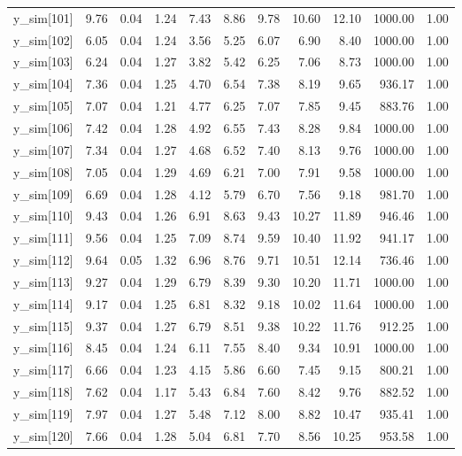 \begin{table}[ht]
\begin{tabular}{rrrrrrrrrrr}
  y\_sim[101] & 9.76 & 0.04 & 1.24 & 7.43 & 8.86 & 9.78 & 10.60 & 12.10 & 1000.00 & 1.00 \\ 
  y\_sim[102] & 6.05 & 0.04 & 1.24 & 3.56 & 5.25 & 6.07 & 6.90 & 8.40 & 1000.00 & 1.00 \\ 
  y\_sim[103] & 6.24 & 0.04 & 1.27 & 3.82 & 5.42 & 6.25 & 7.06 & 8.73 & 1000.00 & 1.00 \\ 
  y\_sim[104] & 7.36 & 0.04 & 1.25 & 4.70 & 6.54 & 7.38 & 8.19 & 9.65 & 936.17 & 1.00 \\ 
  y\_sim[105] & 7.07 & 0.04 & 1.21 & 4.77 & 6.25 & 7.07 & 7.85 & 9.45 & 883.76 & 1.00 \\ 
  y\_sim[106] & 7.42 & 0.04 & 1.28 & 4.92 & 6.55 & 7.43 & 8.28 & 9.84 & 1000.00 & 1.00 \\ 
  y\_sim[107] & 7.34 & 0.04 & 1.27 & 4.68 & 6.52 & 7.40 & 8.13 & 9.76 & 1000.00 & 1.00 \\ 
  y\_sim[108] & 7.05 & 0.04 & 1.29 & 4.69 & 6.21 & 7.00 & 7.91 & 9.58 & 1000.00 & 1.00 \\ 
  y\_sim[109] & 6.69 & 0.04 & 1.28 & 4.12 & 5.79 & 6.70 & 7.56 & 9.18 & 981.70 & 1.00 \\ 
  y\_sim[110] & 9.43 & 0.04 & 1.26 & 6.91 & 8.63 & 9.43 & 10.27 & 11.89 & 946.46 & 1.00 \\ 
  y\_sim[111] & 9.56 & 0.04 & 1.25 & 7.09 & 8.74 & 9.59 & 10.40 & 11.92 & 941.17 & 1.00 \\ 
  y\_sim[112] & 9.64 & 0.05 & 1.32 & 6.96 & 8.76 & 9.71 & 10.51 & 12.14 & 736.46 & 1.00 \\ 
  y\_sim[113] & 9.27 & 0.04 & 1.29 & 6.79 & 8.39 & 9.30 & 10.20 & 11.71 & 1000.00 & 1.00 \\ 
  y\_sim[114] & 9.17 & 0.04 & 1.25 & 6.81 & 8.32 & 9.18 & 10.02 & 11.64 & 1000.00 & 1.00 \\ 
  y\_sim[115] & 9.37 & 0.04 & 1.27 & 6.79 & 8.51 & 9.38 & 10.22 & 11.76 & 912.25 & 1.00 \\ 
  y\_sim[116] & 8.45 & 0.04 & 1.24 & 6.11 & 7.55 & 8.40 & 9.34 & 10.91 & 1000.00 & 1.00 \\ 
  y\_sim[117] & 6.66 & 0.04 & 1.23 & 4.15 & 5.86 & 6.60 & 7.45 & 9.15 & 800.21 & 1.00 \\ 
  y\_sim[118] & 7.62 & 0.04 & 1.17 & 5.43 & 6.84 & 7.60 & 8.42 & 9.76 & 882.52 & 1.00 \\ 
  y\_sim[119] & 7.97 & 0.04 & 1.27 & 5.48 & 7.12 & 8.00 & 8.82 & 10.47 & 935.41 & 1.00 \\ 
  y\_sim[120] & 7.66 & 0.04 & 1.28 & 5.04 & 6.81 & 7.70 & 8.56 & 10.25 & 953.58 & 1.00 \\ 

\end{tabular}
\end{table}
